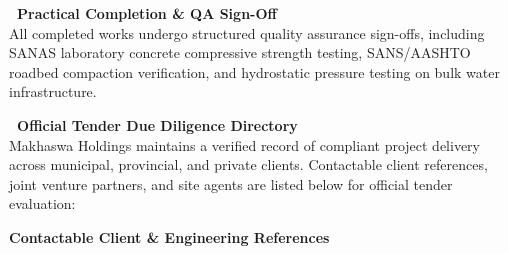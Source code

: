 \hypertarget{sec:references}{}

\noindent
\begin{minipage}[t]{0.485\textwidth}
    \begin{tcolorbox}[
        enhanced, colback=white, colframe=mhlightgray, boxrule=0.8pt, arc=4pt,
        left=9pt, right=9pt, top=8pt, bottom=8pt,
        borderline west={3pt}{0pt}{mhnavy}, drop shadow=black!3
    ]
        {\fontsize{9.5pt}{11.5pt}\selectfont\bfseries\color{mhnavy}\faCheckCircle\ Practical Completion \& QA Sign-Off}\\[2.5pt]
        {\fontsize{8.2pt}{11.2pt}\selectfont\color{mhtext}
        All completed works undergo structured quality assurance sign-offs, including SANAS laboratory concrete compressive strength testing, SANS/AASHTO roadbed compaction verification, and hydrostatic pressure testing on bulk water infrastructure.
        }
    \end{tcolorbox}
\end{minipage}
\hfill
\begin{minipage}[t]{0.485\textwidth}
    \begin{tcolorbox}[
        enhanced, colback=white, colframe=mhlightgray, boxrule=0.8pt, arc=4pt,
        left=9pt, right=9pt, top=8pt, bottom=8pt,
        borderline west={3pt}{0pt}{mhgold}, drop shadow=black!3
    ]
        {\fontsize{9.5pt}{11.5pt}\selectfont\bfseries\color{mhnavy}\faFileContract\ Official Tender Due Diligence Directory}\\[2.5pt]
        {\fontsize{8.2pt}{11.2pt}\selectfont\color{mhtext}
        Makhaswa Holdings maintains a verified record of compliant project delivery across municipal, provincial, and private clients. Contactable client references, joint venture partners, and site agents are listed below for official tender evaluation:
        }
    \end{tcolorbox}
\end{minipage}

\vfill

{\large\bfseries\color{mhnavy} Contactable Client \& Engineering References}
\vspace{0.12cm}

